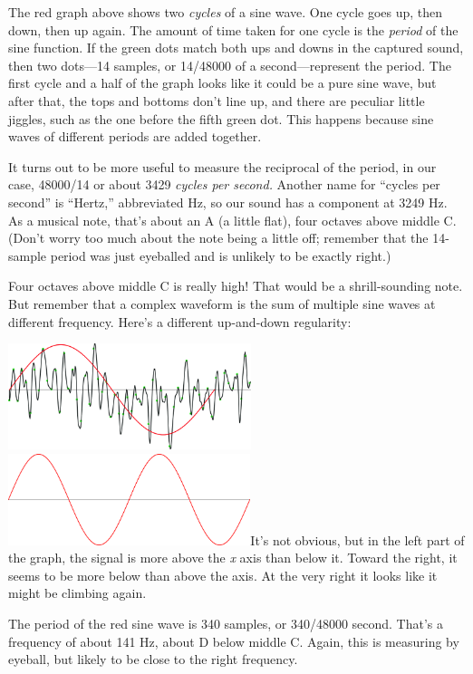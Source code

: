 The red graph above shows two \emph{cycles} of a sine wave. One cycle
goes up, then down, then up again. The amount of time taken for one
cycle is the \emph{period} of the sine function. If the green dots match
both ups and downs in the captured sound, then two dots---14 samples, or
14/48000 of a second---represent the period. The first cycle and a half
of the graph looks like it could be a pure sine wave, but after that,
the tops and bottoms don't line up, and there are peculiar little
jiggles, such as the one before the fifth green dot. This happens
because sine waves of different periods are added together.

It turns out to be more useful to measure the reciprocal of the period,
in our case, 48000/14 or about 3429 \emph{cycles per second.} Another
name for ``cycles per second'' is ``Hertz,'' abbreviated Hz, so our
sound has a component at 3249 Hz. As a musical note, that's about an A
(a little flat), four octaves above middle C. (Don't worry too much
about the note being a little off; remember that the 14-sample period
was just eyeballed and is unlikely to be exactly right.)

Four octaves above middle C is really high! That would be a
shrill-sounding note. But remember that a complex waveform is the sum of
multiple sine waves at different frequency. Here's a different
up-and-down regularity:

\includegraphics[width=2.79514in,height=1.22222in]{media/image828.png}\includegraphics[width=2.78472in,height=1.04861in]{media/image829.png}It's
not obvious, but in the left part of the graph, the signal is more above
the \emph{x} axis than below it. Toward the right, it seems to be more
below than above the axis. At the very right it looks like it might be
climbing again.

The period of the red sine wave is 340 samples, or 340/48000 second.
That's a frequency of about 141 Hz, about D below middle C. Again, this
is measuring by eyeball, but likely to be close to the right frequency.

